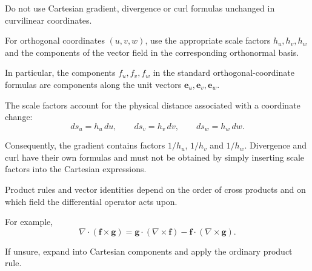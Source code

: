 \begin{mistake}
  Do not use Cartesian gradient, divergence or curl formulas unchanged in curvilinear coordinates.

  For orthogonal coordinates $(u,v,w)$, use the appropriate scale factors $h_u,h_v,h_w$ and the components of the vector field in the corresponding orthonormal basis.

  In particular, the components $f_u,f_v,f_w$ in the standard orthogonal-coordinate formulas are components along the unit vectors $\boldsymbol{e}_u,\boldsymbol{e}_v,\boldsymbol{e}_w$.
\end{mistake}

\begin{mistake}
  The scale factors account for the physical distance associated with a coordinate change:
  \[
  ds_u=h_u\,du,\qquad
  ds_v=h_v\,dv,\qquad
  ds_w=h_w\,dw.
  \]

  Consequently, the gradient contains factors $1/h_u$, $1/h_v$ and $1/h_w$. Divergence and curl have their own formulas and must not be obtained by simply inserting scale factors into the Cartesian expressions.
\end{mistake}

\begin{mistake}
  Product rules and vector identities depend on the order of cross products and on which field the differential operator acts upon.

  For example,
  \[
  \nabla\cdot(\boldsymbol{f}\times\boldsymbol{g})
  =
  \boldsymbol{g}\cdot(\nabla\times\boldsymbol{f})
  -\boldsymbol{f}\cdot(\nabla\times\boldsymbol{g}).
  \]

  If unsure, expand into Cartesian components and apply the ordinary product rule.
\end{mistake}

